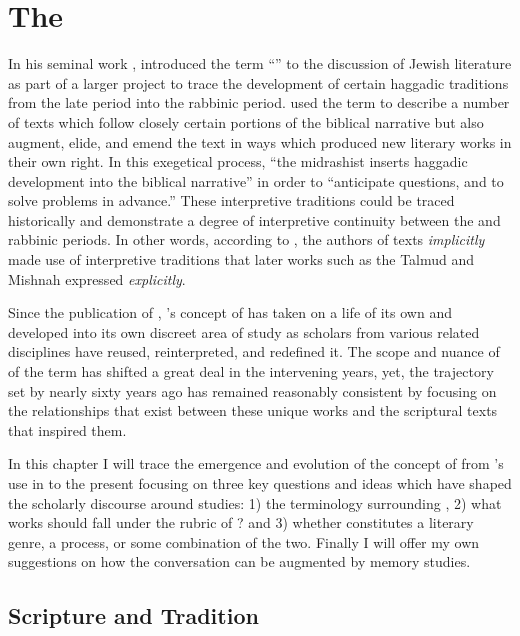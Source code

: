 \hypertarget{the-rwb}{%
\chapter{The \RwB}\label{the-rwb}} 

 In his seminal work , \Vermes introduced the term ``\rwB'' to the discussion of \secondtemple Jewish literature as part of a larger project to trace the development of certain haggadic traditions from the late \secondtemple period into the rabbinic period. \vermes used the term \rwB to describe a number of texts which follow closely certain portions of the biblical narrative but also augment, elide, and emend the text in ways which produced new literary works in their own right. In this exegetical process, ``the midrashist inserts haggadic development into the biblical narrative'' in order to ``anticipate questions, and to solve problems in advance.''\autocites[95]{vermes1961}[see also][]{vermes_zsengeller2014} These interpretive traditions could be traced historically and demonstrate a degree of interpretive continuity between the \secondtemple and rabbinic periods. In other words, according to \vermes, the authors of \rwB texts \emph{implicitly} made use of interpretive traditions that later works such as the Talmud and Mishnah expressed \emph{explicitly}. 

 Since the publication of , \vermes's concept of \rwB has taken on a life of its own and developed into its own discreet area of study as scholars from various related disciplines have reused, reinterpreted, and redefined it. The scope and nuance of of the term \rwB has shifted a great deal in the intervening years, yet, the trajectory set by \vermes nearly sixty years ago has remained reasonably consistent by focusing on the relationships that exist between these unique works and the scriptural texts that inspired them. 

 In this chapter I will trace the emergence and evolution of the concept of \rwB from \vermes's use in  to the present focusing on three key questions and ideas which have shaped the scholarly discourse around \rwB studies: 1) the terminology surrounding \rwB, 2) what works should fall under the rubric of \rwB? and 3) whether \rwB constitutes a literary genre, a process, or some combination of the two. Finally I will offer my own suggestions on how the \rwb conversation can be augmented by memory studies. 

 \hypertarget{scripture-and-tradition}{%
\section{Scripture and Tradition}\label{scripture-and-tradition}} 

